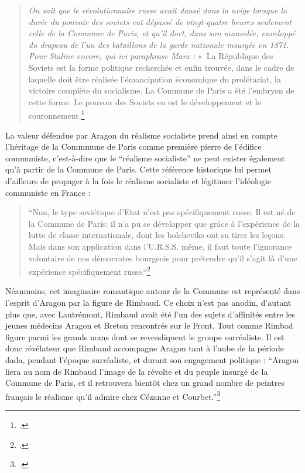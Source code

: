 \begin{quote}
\emph{On sait que le révolutionnaire russe avait dansé dans la neige lorsque la durée du pouvoir des soviets eut dépassé de vingt-quatre heures seulement celle de la Commune de Paris, et qu’il dort, dans son mausolée, enveloppé du drapeau de l’un des bataillons de la garde nationale insurgée en 1871. Pour Staline encore, qui ici paraphrase Marx :} « La République des Soviets est la forme politique recherchée et enfin trouvée, dans le cadre de laquelle doit être réalisée l’émancipation économique du prolétariat, la victoire complète du  socialisme. La Commune de Paris a été l’embryon de cette forme. Le pouvoir des Soviets en est le développement et le couronnement.\footcite[p241]{proces}\end{quote}

La valeur défendue par Aragon du réalisme socialiste prend ainsi en compte l'héritage de la Commmune de Paris comme première pierre de l'édifice communiste, c'est-à-dire que le \enquote{réalisme socialiste} ne peut exister également qu'à partir de la Commune de Paris. Cette référence historique lui permet d'ailleurs de propager à la fois le réalisme socialiste et légitimer l'idéologie communiste en France : 

\begin{quote}
“Non, le type soviétique d’Etat n’est pas spécifiquement russe. Il est né de la Commune de Paris: il n’a pu se développer que grâce à l’expérience de la lutte de classe internationale, dont les bolcheviks ont su tirer les leçons. Mais dans son application dans l’U.R.S.S. même, il faut toute l’ignorance volontaire de nos démocrates bourgeois pour prétendre qu’il s’agit là d’une expérience spécifiquement russe.“\footcite[p121]{lavoinne}	
\end{quote}

Néanmoins, cet imaginaire romantique autour de la Commune est représenté dans l'esprit d'Aragon par la figure de Rimbaud. Ce choix n'est pas anodin, d'autant plus que, avec Lautrémont, Rimbaud avait été l'un des sujets d'affinités entre les jeunes médecins Aragon et Breton rencontrés sur le Front. Tout comme Rimbad figure parmi les grands noms dont se revendiquent le groupe surréaliste. Il est donc révélateur que Rimbaud accompagne Aragon tant à l'aube de la période dada, pendant l'époque surréaliste, et durant son engagement politique : \enquote{Aragon liera au nom de Rimbaud l’image de la révolte et du peuple insurgé de la Commune de Paris, et il retrouvera bientôt chez un grand nombre de peintres français le réalisme qu’il admire chez Cézanne et Courbet.}\footcite[p165]{these}

